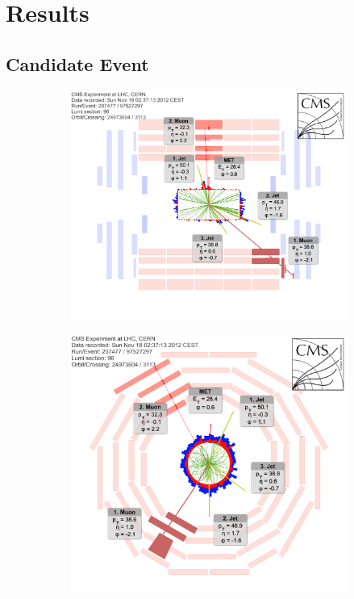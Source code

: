 \chapter{Results}
\label{cha:results}

\section{Candidate Event}
\label{sec:candidate-event}

\begin{figure}[!htbp]
  \centering
  \begin{subfigure}[b]{0.75\textwidth}
    \centering
    \includegraphics[width=\textwidth]{plots/event_display_eta_z.png}
    \caption{\label{fig:evt-eta-z}}
  \end{subfigure}
  \begin{subfigure}[b]{0.75\textwidth}
    \centering
    \includegraphics[width=\textwidth]{plots/event_display_phi_r.png}

\end{subfigure}
\end{figure}
